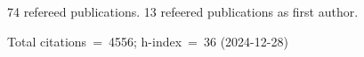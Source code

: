 74 refereed publications. 13 refeered publications as first author.

Total citations~=~4556; h-index~=~36 (2024-12-28)